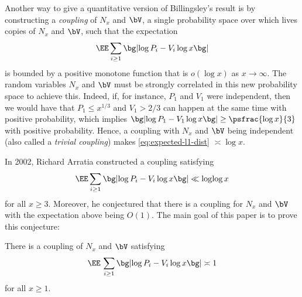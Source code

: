 Another way to give a quantitative version of Billingsley's result is by constructing a \emph{coupling} of $N_x$ and $\bV$, \ie a single probability space over which lives copies of $N_x$ and $\bV$, such that the expectation
\begin{equation}
\label{eq:expected-l1-dist}
\EE\sum_{i \ge 1} \bg|{\log P_i - V_i\log x}\bg|
\end{equation}
is bounded by a positive monotone function that is $o(\log x)$ as $x \to \infty$. The random variables $N_x$ and $\bV$ must be strongly correlated in this new probability space to achieve this. Indeed, if, for instance, $P_1$ and $V_1$ were independent, then we would have that $P_1\le x^{1/3}$ and $V_1>2/3$ can happen at the same time with positive probability, which implies $\bg|{\log P_1 - V_1\log x}\bg| \ge \psfrac{\log x}{3}$ with positive probability. Hence, a coupling with $N_x$ and $\bV$ being independent (also called a \emph{trivial coupling}) makes \eqref{eq:expected-l1-dist} $\asymp \log x$.

In 2002, Richard Arratia \cite{Arratia02} constructed a coupling satisfying
\begin{equation}
\label{eq:arratia02-result}
\EE\sum_{i \ge 1} \bg|{\log P_i - V_i\log x}\bg| \ll \log\!\log x
\end{equation}
for all $x \ge 3$. Moreover, he conjectured that there is a coupling for $N_x$ and $\bV$ with the expectation above being $O(1)$. The main goal of this paper is to prove this conjecture:

\begin{theo}
\label{thm:coupling-ub}
There is a coupling of $N_x$ and $\bV$ satisfying
\[
\EE\, \sum_{i \ge 1} \bg|{\log P_i - V_i\log x}\bg| \asymp 1
\]
for all $x \ge 1$.
\end{theo}


